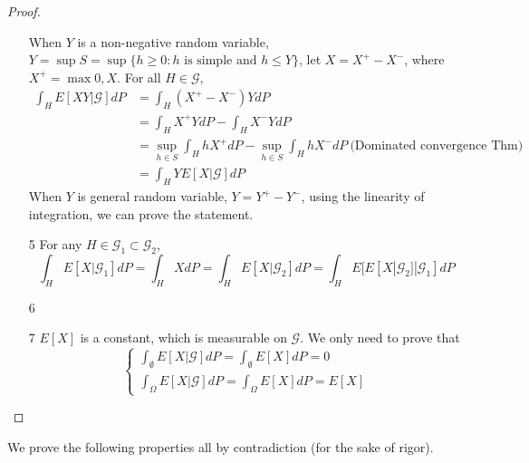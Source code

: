 \begin{proof}
\begin{enumerate}
        When $Y$ is a non-negative random variable, $Y = \sup S = \sup\{h\geq 0: h\text{ is simple and } h\leq Y\}$, let $X = X^+ - X^-$, where $X^+ = \max{0,X}$. For all $H \in \mathcal{G}$, 
        \begin{equation}
            \begin{aligned}
                \int_H E[XY|\mathcal{G}] dP &= \int_H (X^+-X^-)Y dP \\
                & = \int_H X^+Y dP - \int_H X^-Y dP\\
                & = \sup_{h\in S} \int_H h X^+ dP -\sup_{h\in S} \int_H h X^- dP\ \text{(Dominated convergence Thm)}\\
                & = \int_H YE[X|\mathcal{G}] dP
            \end{aligned}
        \end{equation}
        When $Y$ is general random variable, $Y = Y^+ - Y^-$, using the linearity of integration, we can prove the statement. 
        \item[5] For any $H \in \mathcal{G}_1\subset \mathcal{G}_2$, 
        \begin{equation}
            \int_H E[X|\mathcal{G}_1]dP = \int_H X dP = \int_H E[X|\mathcal{G}_2] dP = \int_H E[E[X|\mathcal{G}_2]|\mathcal{G}_1] dP
        \end{equation} 
        \item[6]
        \item[7] $E[X]$ is a constant, which is measurable on $\mathcal{G}$. We only need to prove that 
        \begin{equation}
            \begin{cases}
                \int_\emptyset E[X|\mathcal{G}] dP = \int_\emptyset E[X] dP = 0\\
                \int_\Omega E[X|\mathcal{G}] dP = \int_\Omega E[X] dP = E[X]
            \end{cases}
        \end{equation}    
    \end{enumerate}
\end{proof}
\iffalse
We prove the following properties all by contradiction (for the sake of rigor).
